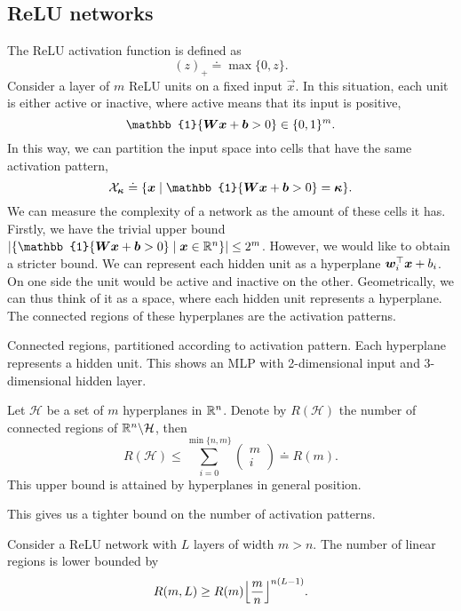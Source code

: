 \subsection{ReLU networks}

The ReLU activation function is defined as \[
    (z)_+ \doteq \max \{ 0,z \}.
\]
Consider a layer of $m$ ReLU units on a fixed input $\vec{x}$. In this situation, each unit is
either active or inactive, where active means that its input is positive, \[
    \mathbb{1}\{ \mat{W} \vec{x} + \vec{b} > 0 \} \in \{ 0,1 \}^m.
\]
In this way, we can partition the input space into cells that have the same activation pattern, \[
    \mathcal{X}_{\vec{\kappa}} \doteq \{ \vec{x} \mid \mathbb{1}\{ \mat{W} \vec{x} + \vec{b} > 0 \} = \vec{\kappa} \}.
\]
We can measure the complexity of a network as the amount of these cells it has. Firstly, we have
the trivial upper bound $|\{ \mathbb{1}\{ \mat{W} \vec{x} + \vec{b} > 0 \} \mid \vec{x} \in \R^n
    \}| \leq 2^m$. However, we would like to obtain a stricter bound. We can represent each hidden unit
as a hyperplane $\bm{w}_i^\top\bm{x} + b_i$. On one side the unit would be active and
inactive on the other. Geometrically, we can thus think of it as a space, where each hidden unit
represents a hyperplane. The connected regions of these hyperplanes are the activation patterns.

\begin{marginfigure}
    \centering
    \caption{Connected regions, partitioned according to activation pattern. Each hyperplane represents a hidden unit. This shows an MLP with 2-dimensional input and 3-dimensional hidden layer.}
    \label{fig:connected-regions}
\end{marginfigure}

\begin{theorem}
    Let $\mathcal{H}$ be a set of $m$ hyperplanes in $\mathbb{R}^n$. Denote by $R(\mathcal{H})$ the number of connected regions of $\mathbb{R}^n \backslash \mathcal{H}$, then \[
        R(\mathcal{H}) \leq \sum_{i=0}^{\min \{ n,m \}} \begin{pmatrix} m \\ i \end{pmatrix} \doteq R(m).
    \]
    This upper bound is attained by hyperplanes in general position.
\end{theorem}

This gives us a tighter bound on the number of activation patterns.

\begin{theorem}
    Consider a ReLU network with $L$ layers of width $m > n$. The number of linear regions is lower bounded by \[
        R(m, L) \geq R(m) \lft\lfloor\frac{m}{n}\rgt\rfloor^{n(L-1)}.
    \]
\end{theorem}

